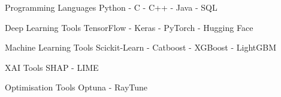 
\begin{cvskills}
  \cvskill
    {Programming Languages} %
    {Python - C - C++ - Java - SQL} %

  \cvskill
    {Deep Learning Tools} %
    {TensorFlow - Keras - PyTorch - Hugging Face} %
    
  \cvskill
    {Machine Learning Tools} %
    {Scickit-Learn - Catboost - XGBoost - LightGBM} %

  \cvskill
    {XAI Tools} %
    {SHAP - LIME} %

  \cvskill
    {Optimisation Tools} %
    {Optuna - RayTune} %
    
\end{cvskills}
